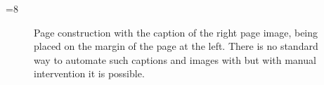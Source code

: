 \documentclass{article}
\begin{document}
\def\test{8}
\ifnum\test=8 \else \fi
\begin{figure}[tbp]
\caption{Page construction with the caption  of the right page image, being placed on the margin of the page at the left. There is no standard way to automate such captions and images with  but with manual
intervention it is possible.}
\label{elizabeth}
\makeatletter

\makeatother
\end{figure}
\end{document}
